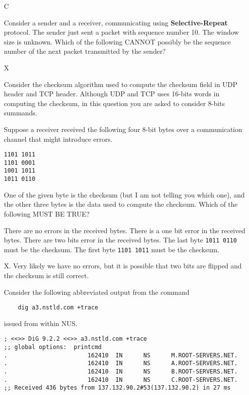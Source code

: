 \documentclass[a4paper,11pt,answers]{exam}
\begin{document}
\begin{questions}
\begin{solution}
C
\end{solution}

\question
Consider a sender and a receiver, communicating using \textbf{Selective-Repeat}
protocol.  The sender just sent a packet with sequence number 10.  The window
size is unknown.  Which of the following CANNOT possibly be the sequence number
of the next packet transmitted by the sender?
\begin{choices}
\end{choices}

\begin{solution}
X 
\end{solution}

\question
Consider the checksum algorithm used to compute the checksum field in UDP   header and TCP header.  Although UDP and TCP uses 16-bits words in computing the checksum, in this  question you are asked to consider 8-bits summands.

Suppose a receiver received the following four 8-bit bytes over a           communication channel that might introduce errors.
\begin{verbatim}
1101 1011
1101 0001
1001 1011
1011 0110
\end{verbatim}
One of the given byte is the checksum (but I am not telling you which one), and the other three bytes is the data used to compute the checksum.  Which of the following MUST BE TRUE?
								          \begin{choices} 
\choice There are no errors in the received bytes.
\choice There is a one bit error in the received bytes.
\choice There are two bits error in the received bytes.
\choice The last byte \texttt{1011 0110} must be the checksum.
\choice The first byte \texttt{1101 1011} must be the checksum.
\end{choices}

\begin{solution}
X.  Very likely we have no errors, but it is possible that two bits are flipped and the checksum is still correct.
\end{solution}

\question
Consider the following abbreviated output from the command
\begin{verbatim}
    dig a3.nstld.com +trace
\end{verbatim}
    issued from within NUS. 
\begin{verbatim}
; <<>> DiG 9.2.2 <<>> a3.nstld.com +trace
;; global options:  printcmd
.                       162410  IN      NS      M.ROOT-SERVERS.NET.
.                       162410  IN      NS      A.ROOT-SERVERS.NET.
.                       162410  IN      NS      B.ROOT-SERVERS.NET.
.                       162410  IN      NS      C.ROOT-SERVERS.NET.
;; Received 436 bytes from 137.132.90.2#53(137.132.90.2) in 27 ms


\end{verbatim}
\end{questions}
\end{document}
